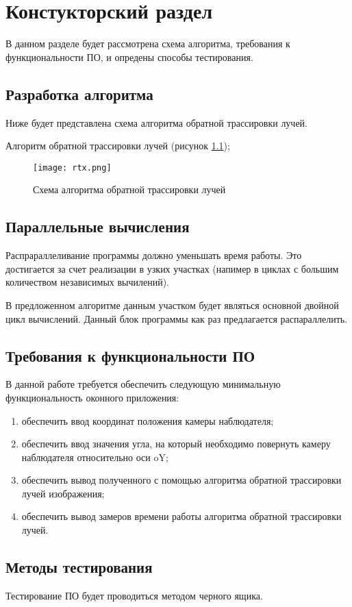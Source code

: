\chapter{ Констукторский раздел}
\label{cha:design}
    В данном разделе будет рассмотрена схема алгоритма, требования к функциональности ПО,
    и опредены способы тестирования.
    
    \section{Разработка алгоритма}
        Ниже будет представлена схема алгоритма обратной трассировки лучей.

        Алгоритм обратной трассировки лучей (рисунок \ref{schema:rtx});


    \begin{figure}[h!]
        \centering
            \texttt{[image: rtx.png]}
            \caption{Схема алгоритма обратной трассировки лучей}
            \label{schema:rtx}
    \end{figure}

    \section{Параллельные вычисления}
Распрараллеливание программы должно уменьшать время работы. Это достигается за счет реализации в узких участках (напимер в циклах с большим количеством независимых вычилений).

В предложенном алгоритме данным участком будет являться основной двойной цикл вычислений.
Данный блок программы как раз предлагается распараллелить.


    \section{Требования к функциональности ПО}
        В данной работе требуется обеспечить следующую минимальную функциональность оконного приложения:
        \begin{enumerate}
	\item обеспечить ввод координат положения камеры наблюдателя;
	\item обеспечить ввод значения угла, на который необходимо повернуть камеру наблюдателя относительно оси oY;
            \item обеспечить вывод полученного с помощью алгоритма обратной трассировки лучей изображения;
            \item обеспечить вывод замеров времени работы алгоритма обратной трассировки лучей.
        \end{enumerate}

    \section{Методы тестирования}
    Тестирование ПО будет проводиться методом черного ящика.

\newpage
